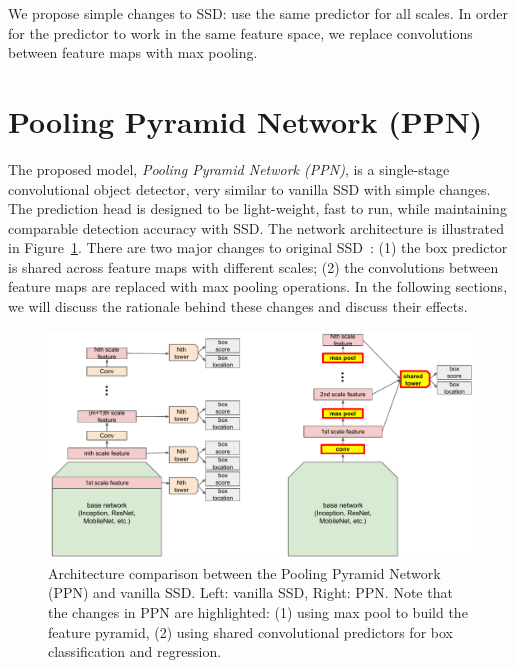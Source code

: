 \documentclass[10pt,twocolumn,letterpaper]{article}
\begin{document}
We propose simple changes to SSD: use the same predictor
for all scales. In order for the predictor to work in the
same feature space, we replace convolutions between
feature maps with max pooling.










\section{Pooling Pyramid Network (PPN)}
The proposed model, \textit{Pooling Pyramid Network (PPN)},
is a single-stage convolutional object detector, very
similar to vanilla SSD with simple changes.  The prediction head is
designed to be light-weight, fast to run, while maintaining
comparable detection accuracy with SSD.
The network architecture is illustrated in
Figure~\ref{fig:ppn}.  There are two major changes to
original SSD~\cite{liu2016ssd}: (1) the box predictor is
shared across feature maps with different scales; (2) the
convolutions between feature maps are replaced with max
pooling operations.  In the following sections, we will
discuss the rationale behind these changes and discuss their effects.

\begin{figure}[t]
\begin{center}
\includegraphics[width=1.0\linewidth]{figure/ppn_vs_ssd.pdf}
\end{center}
\caption{
Architecture comparison between the Pooling Pyramid Network (PPN)
and vanilla SSD. Left: vanilla SSD, Right: PPN.
Note that the changes in PPN are highlighted:
(1) using max pool to build the feature pyramid,
(2) using shared convolutional predictors for box classification and regression.
}
\label{fig:ppn}
\end{figure}
\end{document}
